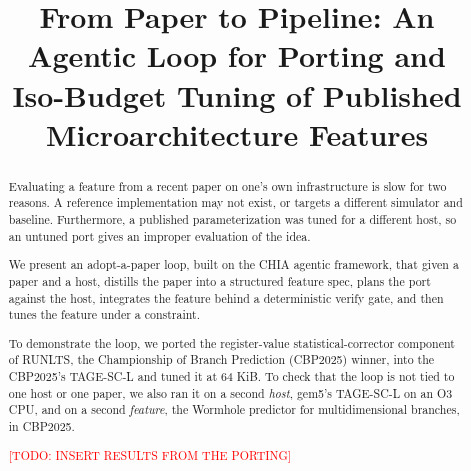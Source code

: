\documentclass[conference]{IEEEtran}
\newcommand{\todo}[1]{\textcolor{red}{[TODO: #1]}}
\begin{document}
\title{From Paper to Pipeline: An Agentic Loop for Porting and\\
Iso-Budget Tuning of Published Microarchitecture Features}

\author{
\and
{}
}

\maketitle

\begin{abstract}
Evaluating a feature from a recent paper on one's own infrastructure is slow
for two reasons. A reference implementation may not exist, or targets a
different simulator and baseline. Furthermore, a published parameterization was tuned
for a different host, so an untuned port gives an improper evaluation of the idea.

We present an adopt-a-paper loop, built on the CHIA agentic framework,
that given a paper and a host, distills the paper
into a structured feature spec, plans the port against the host,
integrates the feature behind a deterministic verify gate,
and then tunes the feature under a constraint.

To demonstrate the loop, we ported the register-value statistical-corrector
component of RUNLTS, the Championship of Branch Prediction (CBP2025) winner, into the CBP2025's TAGE-SC-L and tuned it at 64 KiB. To check that the loop is not tied to one host or one
paper, we also ran it on a second \textit{host}, gem5's TAGE-SC-L on an O3 CPU, and on
a second \textit{feature}, the Wormhole predictor for multidimensional branches, in
CBP2025.

\todo{INSERT RESULTS FROM THE PORTING}

\end{abstract}
\end{document}
